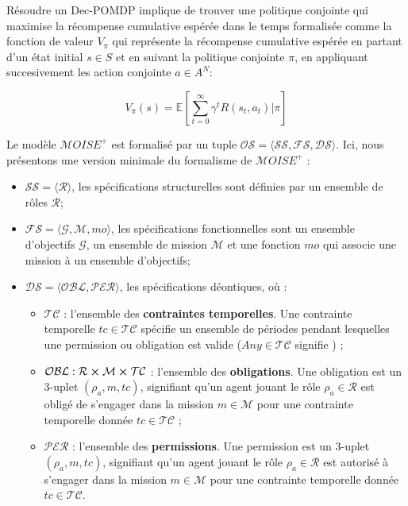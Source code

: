 \documentclass[sigconf,anonymous]{aamas}
\begin{document}
Résoudre un Dec-POMDP implique de trouver une politique conjointe qui maximise la récompense cumulative espérée dans le temps formalisée comme la fonction de valeur $V_\pi$ qui représente la récompense cumulative espérée en partant d'un état initial $s \in S$ et en suivant la politique conjointe $\pi$, en appliquant succesivement les action conjointe $a \in A^N$:

\[
V_\pi(s) = \mathbb{E} \left[ \sum_{t=0}^{\infty} \gamma^t R(s_t, a_t) \bigg| \pi \right]
\]

Le modèle $\mathcal{M}OISE^+$ est formalisé par un tuple $\mathcal{OS} = \langle \mathcal{SS}, \mathcal{FS}, \mathcal{DS} \rangle$. Ici, nous présentons une version minimale du formalisme de $\mathcal{M}OISE^+$ :
\begin{itemize}
    \item $\mathcal{SS} = \langle \mathcal{R} \rangle$, les spécifications structurelles sont définies par un ensemble de rôles $\mathcal{R}$;
    \item $\mathcal{FS} = \langle \mathcal{G}, \mathcal{M}, mo \rangle$, les spécifications fonctionnelles sont un ensemble d'objectifs $\mathcal{G}$, un ensemble de mission $\mathcal{M}$ et une fonction $mo$ qui associe une mission à un ensemble d'objectifs;
    \item $\mathcal{DS} = \langle \mathcal{OBL}, \mathcal{PER} \rangle$, les spécifications déontiques, où :
    \begin{itemize}
        \item $\mathcal{TC}$ : l'ensemble des \textbf{contraintes temporelles}. Une contrainte temporelle $tc \in \mathcal{TC}$ spécifie un ensemble de périodes pendant lesquelles une permission ou obligation est valide ($Any \in \mathcal{TC}$ signifie ) ;
        \item $\mathcal{OBL} : \mathcal{R} \cross \mathcal{M} \cross \mathcal{TC}$ : l'ensemble des \textbf{obligations}. Une obligation est un 3-uplet $(\rho_a, m, tc)$, signifiant qu'un agent jouant le rôle $\rho_a \in \mathcal{R}$ est obligé de s'engager dans la mission $m \in \mathcal{M}$ pour une contrainte temporelle donnée $tc \in \mathcal{TC}$ ;
        \item $\mathcal{PER}$ : l'ensemble des \textbf{permissions}. Une permission est un 3-uplet $(\rho_a, m, tc)$, signifiant qu'un agent jouant le rôle $\rho_a \in \mathcal{R}$ est autorisé à s'engager dans la mission $m \in \mathcal{M}$ pour une contrainte temporelle donnée $tc \in \mathcal{TC}$.
    \end{itemize}

\end{itemize}
\end{document}
